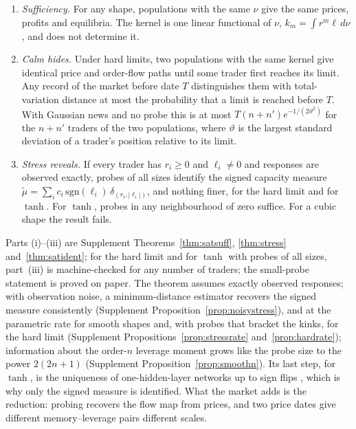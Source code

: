 \begin{theorem}\label{n:sat_thm}
\begin{enumerate}[label=(\roman*),itemsep=1pt]
\item \emph{Sufficiency.} For any shape, populations with the same $\nu$ give the same prices, profits and equilibria. The kernel is one linear functional of $\nu$, $k_m=\int r^m\ell\,d\nu$, and does not determine it.
\item \emph{Calm hides.} Under hard limits, two populations with the same kernel give identical price and order-flow paths until some trader first reaches its limit. Any record of the market before date $T$ distinguishes them with total-variation distance at most the probability that a limit is reached before $T$. With Gaussian news and no probe this is at most $T(n+n')e^{-1/(2\vartheta^2)}$ for the $n+n'$ traders of the two populations, where $\vartheta$ is the largest standard deviation of a trader's position relative to its limit.
\item \emph{Stress reveals.} If every trader has $r_i\ge0$ and $\ell_i\ne0$ and responses are observed exactly, probes of all sizes identify the signed capacity measure $\tilde\mu=\sum_ic_i\,\mathrm{sgn}(\ell_i)\,\delta_{(r_i,|\ell_i|)}$, and nothing finer, for the hard limit and for $\tanh$. For $\tanh$, probes in any neighbourhood of zero suffice. For a cubic shape the result fails.
\end{enumerate}
\end{theorem}

Parts (i)--(iii) are Supplement Theorems~\ref{thm:satsuff}, \ref{thm:stress} and~\ref{thm:satident}; for the hard limit and for $\tanh$ with probes of all sizes, part~(iii) is machine-checked for any number of traders; the small-probe statement is proved on paper. The theorem assumes exactly observed responses; with observation noise, a minimum-distance estimator recovers the signed measure consistently (Supplement Proposition~\ref{prop:noisystress}), and at the parametric rate for smooth shapes and, with probes that bracket the kinks, for the hard limit (Supplement Propositions~\ref{prop:stressrate} and~\ref{prop:hardrate}); information about the order-$n$ leverage moment grows like the probe size to the power $2(2n+1)$ (Supplement Proposition~\ref{prop:smoothn}). Its last step, for $\tanh$, is the uniqueness of one-hidden-layer networks up to sign flips \citep{sussmann1992}, which is why only the signed measure is identified. What the market adds is the reduction: probing recovers the flow map from prices, and two price dates give different memory--leverage pairs different scales.

